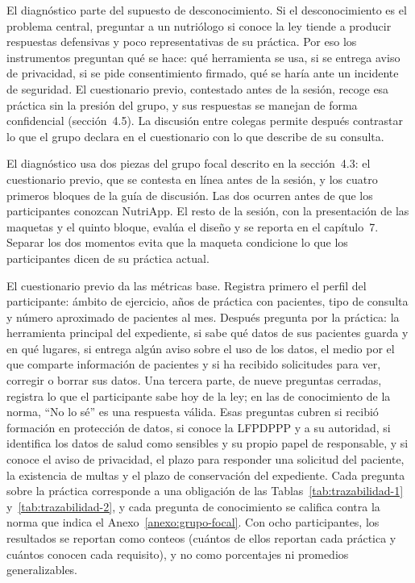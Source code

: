 \documentclass[12pt, a4paper]{article}
\begin{document}
El diagnóstico parte del supuesto de desconocimiento. Si el desconocimiento es el
problema central, preguntar a un nutriólogo si conoce la ley tiende a producir
respuestas defensivas y poco representativas de su práctica. Por eso
los instrumentos preguntan qué se hace: qué herramienta se usa, si se
entrega aviso de privacidad, si se pide consentimiento firmado, qué se
haría ante un incidente de seguridad. El cuestionario previo, contestado
antes de la sesión, recoge esa práctica sin la presión del grupo, y sus
respuestas se manejan de forma confidencial (sección~4.5). La discusión
entre colegas permite después contrastar lo que el grupo
declara en el cuestionario con lo que describe de su consulta.

El diagnóstico usa dos piezas del grupo focal descrito en la
sección~4.3: el cuestionario previo, que se contesta en línea antes de
la sesión, y los cuatro primeros bloques de la guía de discusión. Las
dos ocurren antes de que los participantes conozcan NutriApp. El resto
de la sesión, con la presentación de las maquetas y el quinto bloque,
evalúa el diseño y se reporta en el capítulo~7. Separar los dos momentos
evita que la maqueta condicione lo que los participantes dicen de su
práctica actual.
 
El cuestionario previo da las métricas base. Registra primero el perfil
del participante: ámbito de ejercicio, años de práctica con pacientes,
tipo de consulta y número aproximado de pacientes al mes. Después
pregunta por la práctica: la herramienta principal del expediente, si
sabe qué datos de sus pacientes guarda y en qué lugares, si entrega
algún aviso sobre el uso de los datos, el medio por el que comparte
información de pacientes y si ha recibido solicitudes para ver, corregir
o borrar sus datos. Una tercera parte, de nueve preguntas cerradas,
registra lo que el participante sabe hoy de la ley; en las de
conocimiento de la norma, ``No lo sé'' es una respuesta válida. Esas
preguntas cubren si recibió formación en protección de datos, si conoce
la LFPDPPP y a su autoridad, si identifica los datos de salud como
sensibles y su propio papel de responsable, y si conoce el aviso de
privacidad, el plazo para responder una solicitud del paciente, la
existencia de multas y el plazo de conservación del expediente. Cada
pregunta sobre la práctica corresponde a una obligación de las
Tablas~\ref{tab:trazabilidad-1} y~\ref{tab:trazabilidad-2}, y cada
pregunta de conocimiento se califica contra la norma que indica el
Anexo~\ref{anexo:grupo-focal}. Con ocho participantes, los resultados se
reportan como conteos (cuántos de ellos reportan cada
práctica y cuántos conocen cada requisito), y no como porcentajes ni
promedios generalizables.
\end{document}
